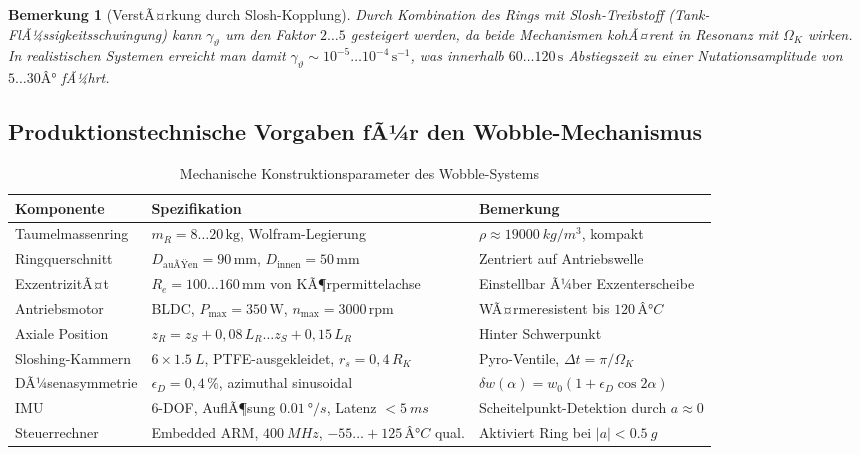 ﻿\documentclass[12pt,a4paper]{article}
\newtheorem{bemerkung}{Bemerkung}[section]
\begin{document}
\begin{bemerkung}[VerstÃ¤rkung durch Slosh-Kopplung]
Durch Kombination des Rings mit Slosh-Treibstoff (Tank-FlÃ¼ssigkeitsschwingung)
kann $\gamma_\vartheta$ um den Faktor $2\ldots5$ gesteigert werden,
da beide Mechanismen kohÃ¤rent in Resonanz mit $\Omega_K$ wirken.
In realistischen Systemen erreicht man damit
$\gamma_\vartheta \sim 10^{-5}\ldots10^{-4}\,\mathrm{s}^{-1}$,
was innerhalb $60\ldots120\,\mathrm{s}$ Abstiegszeit
zu einer Nutationsamplitude von $5\ldots 30Â°$ fÃ¼hrt.
\end{bemerkung}

\subsection{Produktionstechnische Vorgaben fÃ¼r den Wobble-Mechanismus}

\begin{table}
\centering
\caption{Mechanische Konstruktionsparameter des Wobble-Systems}
\label{tab:wobble_params}
\begin{tabular}{lll}
\toprule
\textbf{Komponente} & \textbf{Spezifikation} & \textbf{Bemerkung}\\
\midrule
Taumelmassenring  & $m_R = 8\ldots20\,\mathrm{kg}$, Wolfram-Legierung &
  $\rho \approx \SI{19000}{kg/m^3}$, kompakt\\
Ringquerschnitt   & $D_{\mathrm{auÃŸen}} = 90\,\mathrm{mm}$, $D_{\mathrm{innen}}=50\,\mathrm{mm}$ &
  Zentriert auf Antriebswelle\\
ExzentrizitÃ¤t     & $R_e = 100\ldots160\,\mathrm{mm}$ von KÃ¶rpermittelachse &
  Einstellbar Ã¼ber Exzenterscheibe\\
Antriebsmotor     & BLDC, $P_{\mathrm{max}} = 350\,\mathrm{W}$, $n_{\max}=3000\,\mathrm{rpm}$ &
  WÃ¤rmeresistent bis $120\,Â°C$\\
Axiale Position   & $z_R = z_S + 0{,}08\,L_R\ldots z_S + 0{,}15\,L_R$ &
  Hinter Schwerpunkt\\
Sloshing-Kammern  & $6\times \SI{1.5}{L}$, PTFE-ausgekleidet, $r_s=0{,}4\,R_K$ &
  Pyro-Ventile, $\Delta t = \pi/\Omega_K$\\
DÃ¼senasymmetrie   & $\epsilon_D = 0{,}4\,\%$, azimuthal sinusoidal &
  $\delta w(\alpha)=w_0(1+\epsilon_D\cos2\alpha)$\\
IMU               & 6-DOF, AuflÃ¶sung $\SI{0.01}{\degree/s}$, Latenz $<\SI{5}{ms}$ &
  Scheitelpunkt-Detektion durch $a\approx0$\\
Steuerrechner     & Embedded ARM, $\SI{400}{MHz}$, $-55\ldots+125\,Â°C$ qual. &
  Aktiviert Ring bei $|a|<\SI{0.5}{g}$\\
\bottomrule
\end{tabular}
\end{table}
\end{document}

